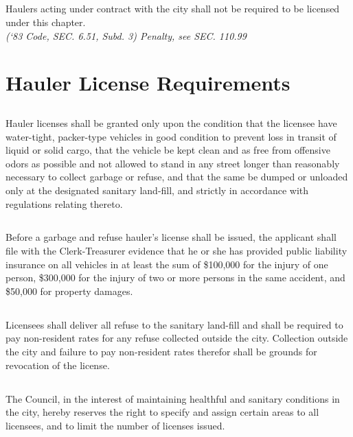 \subsection{}
Haulers acting under contract with the city shall not be required to be licensed under this chapter.\\
\emph{(‘83 Code, SEC. 6.51, Subd. 3)  Penalty, see SEC. 110.99}
\section{Hauler License Requirements}
\subsection{}
Hauler licenses shall be granted only upon the condition that the licensee have water-tight, packer-type vehicles in good condition to prevent loss in transit of liquid or solid cargo, that the vehicle be kept clean and as free from offensive odors as possible and not allowed to stand in any street longer than reasonably necessary to collect garbage or refuse, and that the same be dumped or unloaded only at the designated sanitary land-fill, and strictly in accordance with regulations relating thereto.
\subsection{}
Before a garbage and refuse hauler’s license shall be issued, the applicant shall file with the Clerk-Treasurer evidence that he or she has provided public liability insurance on all vehicles in at least the sum of \$100,000 for the injury of one person, \$300,000 for the injury of two or more persons in the same accident, and \$50,000 for property damages.
\subsection{}
Licensees shall deliver all refuse to the sanitary land-fill and shall be required to pay non-resident rates for any refuse collected outside the city.  Collection outside the city and failure to pay non-resident rates therefor shall be grounds for revocation of the license.
\subsection{}
The Council, in the interest of maintaining healthful and sanitary conditions in the city, hereby reserves the right to specify and assign certain areas to all licensees, and to limit the number of licenses issued.
